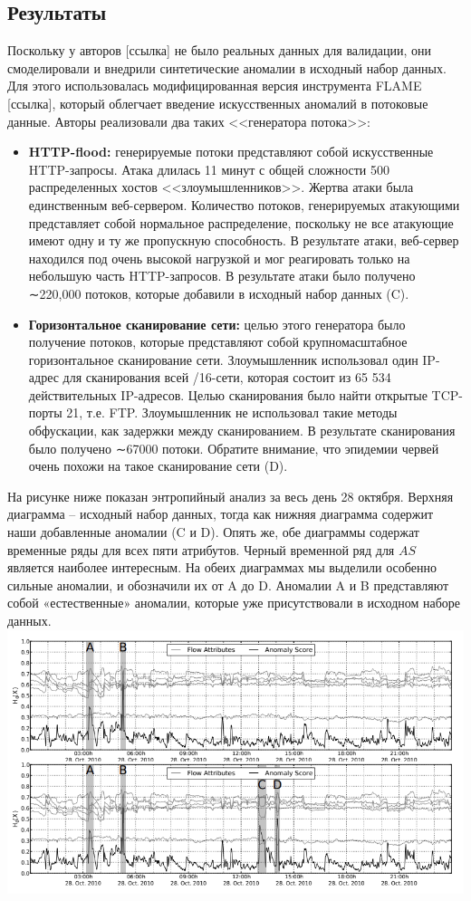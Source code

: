 \documentclass[]{interact}
\theoremstyle{plain}%
\theoremstyle{definition}
\theoremstyle{remark}
\begin{document}
\subsection{Результаты}
Поскольку у авторов [ссылка] не было реальных данных для валидации, они
смоделировали и внедрили синтетические аномалии в исходный набор данных. Для этого использовалась модифицированная версия инструмента FLAME [ссылка], который облегчает введение искусственных аномалий в потоковые данные. Авторы реализовали два таких
<<генератора потока>>:
\begin{itemize}
    \item \textbf{HTTP-flood:} генерируемые потоки представляют собой искусственные HTTP-запросы. Атака длилась 11 минут с общей сложности 500 распределенных хостов <<злоумышленников>>. Жертва атаки была единственным веб-сервером. Количество потоков, генерируемых атакующими представляет собой нормальное распределение, поскольку не все атакующие имеют одну и ту же пропускную способность. В результате атаки, веб-сервер находился под очень высокой нагрузкой и мог реагировать только на небольшую часть HTTP-запросов. В результате атаки было получено ∼220,000 потоков, которые добавили в исходный набор данных (C).
    \item \textbf{Горизонтальное сканирование сети:} целью этого генератора было получение потоков, которые представляют собой крупномасштабное горизонтальное сканирование сети. Злоумышленник использовал один IP-адрес для сканирования всей /16-сети, которая состоит из 65 534 действительных IP-адресов. Целью сканирования было найти открытые TCP-порты 21, т.е. FTP. Злоумышленник не использовал такие методы обфускации, как задержки между сканированием. В результате сканирования было получено ∼67000 потоки. Обратите внимание, что эпидемии червей очень похожи на такое сканирование сети (D).
\end{itemize}

На рисунке ниже показан энтропийный анализ за весь день 28 октября. Верхняя диаграмма -- исходный набор данных, тогда как нижняя диаграмма содержит наши добавленные аномалии (C и D). Опять же, обе диаграммы содержат временные ряды для всех пяти атрибутов. Черный временной ряд для $AS$ является наиболее интересным. На обеих диаграммах мы выделили особенно сильные аномалии, и обозначили их от A до D. Аномалии A и B представляют собой «естественные» аномалии, которые уже присутствовали в исходном наборе данных.
\includegraphics[scale=0.5]{./img1.png}
\end{document}
